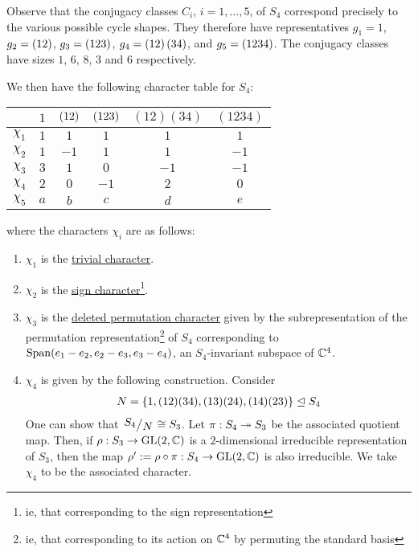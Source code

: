 \begin{boxexample}[$S_4$]
    Observe that the conjugacy classes $C_i$, $i = 1, \ldots, 5$, of $S_4$ correspond precisely to the various possible cycle shapes. They therefore have representatives $g_1 = 1$, $g_2 = \left( 12 \right)$, $g_3 = \left( 123 \right)$, $g_4 = \left( 12 \right)\left( 34 \right)$, and $g_5 = \left( 1234 \right)$. The conjugacy classes have sizes $1$, $6$, $8$, $3$ and $6$ respectively.

    We then have the following character table for $S_4$:
    \begin{table}[H]
        \centering
        \begin{tabular}{c|ccccc}
            & $1$ & $\left( 12 \right)$ & $\left( 123 \right)$ & $(12)(34)$ & $(1234)$ \\
            \hline
            $\chi_1$ & $1$ & $1$ & $1$ & $1$ & $1$ \\
            $\chi_2$ & $1$ & $-1$ & $1$ & $1$ & $-1$ \\
            $\chi_3$ & $3$ & $1$ & $0$ & $-1$ & $-1$ \\
            $\chi_4$ & $2$ & $0$ & $-1$ & $2$ & $0$ \\
            $\chi_5$ & $a$ & $b$ & $c$ & $d$ & $e$
        \end{tabular}
    \end{table}
    where the characters $\chi_i$ are as follows:
    \begin{enumerate}
        \item $\chi_1$ is the \underline{trivial character}.
        
        \item $\chi_2$ is the \underline{sign character}\footnote{ie, that corresponding to the sign representation}.
        
        \item $\chi_3$ is the \underline{deleted permutation character} given by the subrepresentation of the permutation representation\footnote{ie, that corresponding to its action on $\mathbb{C}^4$ by permuting the standard basis} of $S_4$ corresponding to $\operatorname{Span}\!\left( e_1 - e_2, e_2 - e_3, e_3 - e_4 \right)$, an $S_4$-invariant subspace of $\mathbb{C}^4$.
        
        \item $\chi_4$ is given by the following construction. Consider
        \begin{align*}
            N = \left\{ 1, (12)(34), (13)(24), (14)(23) \right\} \trianglelefteq S_4
        \end{align*}
        One can show that $\quotient{S_4}{N} \cong S_3$. Let $\pi : S_4 \twoheadrightarrow S_3$ be the associated quotient map. Then, if $\rho : S_3 \to \operatorname{GL}\!\left( 2, \mathbb{C} \right)$ is a $2$-dimensional irreducible representation of $S_3$, then the map $\rho' := \rho \circ \pi : S_4 \to \operatorname{GL}\!\left( 2, \mathbb{C} \right)$ is also irreducible. We take $\chi_4$ to be the associated character.


\end{enumerate}
\end{boxexample}
